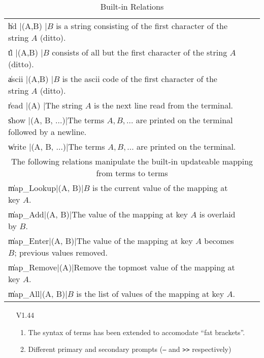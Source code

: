 \begin{center}
\begin{table}[hpb]
\begin{tabular}{|l|l|l|}
\\
\|hd            |(A,B)      |$B$ is a string consisting of the first character of the string $A$ (ditto).
\\
\|tl            |(A,B)      |$B$ consists of all but the first character of the string $A$ (ditto).
\\
\|ascii         |(A,B)      |$B$ is the ascii code of the first character of the string $A$ (ditto).
\\
\|read          |(A)        |The string $A$ is the next line read from the terminal.
\\
\|show          |(A, B, ...)|The terms $A, B, ...$ are printed on the terminal followed by a newline.
\\
\|write         |(A, B, ...)|The terms $A, B, ...$ are printed on the terminal.
\\
\hline
\multicolumn{3}{|c|}{The following relations manipulate the built-in updateable mapping from terms to terms}
\\
\hline
\|map\_Lookup|(A, B)|$B$ is the current value of the mapping at key $A$. 
\\
\|map\_Add|(A, B)|The value of the mapping at key $A$ is overlaid by $B$. 
\\
\|map\_Enter|(A, B)|The value of the mapping at key $A$ becomes $B$; previous values removed. 
\\
\|map\_Remove|(A)|Remove the topmost value of the mapping at key $A$. 
\\
\|map\_All|(A, B)|$B$ is the list of values of the mapping at key $A$. 
\\
\hline
\end{tabular}
\caption{Built-in Relations}
\label{Builtin}
\end{table}
\end{center}


\begin{enumerate}
\item[V1.44]  
\begin{enumerate}
\item The syntax of terms has been extended to accomodate ``fat brackets''. 
\item Different primary and secondary prompts ({\tt --} and {\tt >>} respectively)
\end{enumerate}\end{enumerate}















